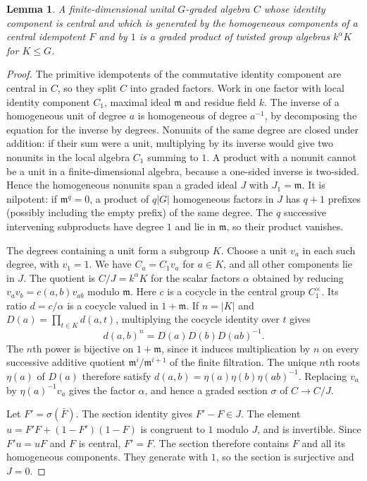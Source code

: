 \documentclass[11pt]{amsart}
\newtheorem{lemma}{Lemma}[section]
\theoremstyle{definition}
\begin{document}
\begin{lemma}\label{graded}
A finite-dimensional unital $G$-graded algebra $C$ whose identity component is central and which is generated by the homogeneous components of a central idempotent $F$ and by $1$ is a graded product of twisted group algebras $k^\alpha K$ for $K\le G$.
\end{lemma}
\begin{proof}
The primitive idempotents of the commutative identity component are central in $C$, so they split $C$ into graded factors. Work in one factor with local identity component $C_1$, maximal ideal $\mathfrak m$ and residue field $k$. The inverse of a homogeneous unit of degree $a$ is homogeneous of degree $a^{-1}$, by decomposing the equation for the inverse by degrees. Nonunits of the same degree are closed under addition: if their sum were a unit, multiplying by its inverse would give two nonunits in the local algebra $C_1$ summing to $1$. A product with a nonunit cannot be a unit in a finite-dimensional algebra, because a one-sided inverse is two-sided. Hence the homogeneous nonunits span a graded ideal $J$ with $J_1=\mathfrak m$. It is nilpotent: if $\mathfrak m^q=0$, a product of $q|G|$ homogeneous factors in $J$ has $q+1$ prefixes (possibly including the empty prefix) of the same degree. The $q$ successive intervening subproducts have degree $1$ and lie in $\mathfrak m$, so their product vanishes.

The degrees containing a unit form a subgroup $K$. Choose a unit $v_a$ in each such degree, with $v_1=1$. We have $C_a=C_1v_a$ for $a\in K$, and all other components lie in $J$. The quotient is $C/J=k^\alpha K$ for the scalar factors $\alpha$ obtained by reducing $v_av_b=c(a,b)v_{ab}$ modulo $\mathfrak m$. Here $c$ is a cocycle in the central group $C_1^\times$. Its ratio $d=c/\alpha$ is a cocycle valued in $1+\mathfrak m$. If $n=|K|$ and $D(a)=\prod_{t\in K}d(a,t)$, multiplying the cocycle identity over $t$ gives
\[
 d(a,b)^n=D(a)D(b)D(ab)^{-1}.
\]
The $n$th power is bijective on $1+\mathfrak m$, since it induces multiplication by $n$ on every successive additive quotient $\mathfrak m^i/\mathfrak m^{i+1}$ of the finite filtration. The unique $n$th roots $\eta(a)$ of $D(a)$ therefore satisfy $d(a,b)=\eta(a)\eta(b)\eta(ab)^{-1}$. Replacing $v_a$ by $\eta(a)^{-1}v_a$ gives the factor $\alpha$, and hence a graded section $\sigma$ of $C\to C/J$.

Let $F'=\sigma(\bar F)$. The section identity gives $F'-F\in J$. The element $u=F'F+(1-F')(1-F)$ is congruent to $1$ modulo $J$, and is invertible. Since $F'u=uF$ and $F$ is central, $F'=F$. The section therefore contains $F$ and all its homogeneous components. They generate with $1$, so the section is surjective and $J=0$.
\end{proof}
\end{document}
